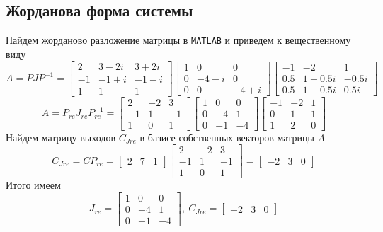 \documentclass[a4paper, 12pt]{article}
\begin{document}
    \subsection{Жорданова форма системы}
    Найдем жорданово разложение матрицы в \texttt{MATLAB} и приведем к вещественному виду
    $$
    A=PJP^{-1}=\begin{bmatrix} 
    2	&3-2i	&3+2i\\
    -1	&-1+i	&-1-i\\
    1	   &1	   &1 
    \end{bmatrix}\begin{bmatrix}
    1	   &0	   &0\\
    0	&-4-i	   &0\\
    0	   &0	&-4+i
    \end{bmatrix}\begin{bmatrix}
    -1	     &-2	   &1\\
    0.5	&1-0.5i	&-0.5i\\
    0.5	&1+0.5i	 &0.5i
    \end{bmatrix}
    $$
    $$
    A=P_{re}J_{re}P_{re}^{-1}=\begin{bmatrix}
    2    &-2     &3\\
    -1     &1    &-1\\
     1     &0     &1
    \end{bmatrix}\begin{bmatrix}
    1     &0     &0\\
    0    &-4     &1\\
    0    &-1    &-4
    \end{bmatrix}\begin{bmatrix}
    -1    &-2     &1\\
    0     &1     &1\\
    1     &2     &0
    \end{bmatrix}
    $$
    Найдем матрицу выходов $C_{Jre}$ в базисе собственных векторов матрицы $A$
    $$
    C_{Jre}=CP_{re}=\begin{bmatrix}
        2 &7 &1
    \end{bmatrix}\begin{bmatrix}
        2    &-2     &3\\
        -1     &1    &-1\\
         1     &0     &1
    \end{bmatrix}=\begin{bmatrix}
        -2     &3     &0
    \end{bmatrix}
    $$
    Итого имеем
    $$J_{re}=\begin{bmatrix}
        1     &0     &0\\
        0    &-4     &1\\
        0    &-1    &-4
    \end{bmatrix},\ C_{Jre}=\begin{bmatrix}
        -2     &3     &0
    \end{bmatrix}
    $$
\end{document}

